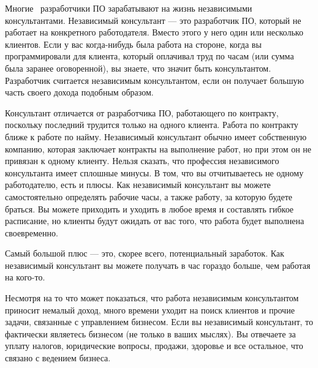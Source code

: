 \documentclass{../industrial-development}
\begin{document}
\lecturenotes

Многие~\cite[с.~62--67]{Sonmez} разработчики ПО зарабатывают на жизнь независимыми консультантами. Независимый консультант — это разработчик ПО, который не работает на конкретного работодателя. Вместо этого у него один или несколько клиентов. Если у вас когда-нибудь была работа на стороне, когда вы программировали для клиента, который оплачивал труд по часам (или сумма была заранее оговоренной), вы знаете, что значит быть консультантом.
Разработчик считается независимым консультантом, если он получает большую часть своего дохода подобным образом.

 Консультант отличается от разработчика ПО, работающего по контракту, поскольку последний трудится только на одного  клиента. Работа по контракту ближе к работе по найму. Независимый консультант обычно имеет собственную компанию, которая заключает контракты на выполнение работ, но при этом он не привязан к одному клиенту.
Нельзя сказать, что профессия независимого консультанта имеет сплошные минусы. В том, что вы отчитываетесь не одному работодателю, есть и плюсы. Как независимый консультант вы можете самостоятельно определять рабочие часы, а также работу, за которую будете браться. Вы можете приходить и уходить в любое время и составлять гибкое расписание, но клиенты будут ожидать от вас того, что работа будет выполнена своевременно.

Самый большой плюс — это, скорее всего, потенциальный заработок. Как независимый консультант вы можете получать в час гораздо больше, чем работая на кого-то. 

Несмотря на то что может показаться, что работа независимым консультантом приносит немалый доход, много времени уходит на поиск клиентов и прочие задачи, связанные с управлением бизнесом. Если вы независимый консультант, то фактически являетесь бизнесом (не только в ваших мыслях). Вы отвечаете за уплату налогов, юридические вопросы, продажи, здоровье и все остальное, что связано с ведением бизнеса.
\end{document}

